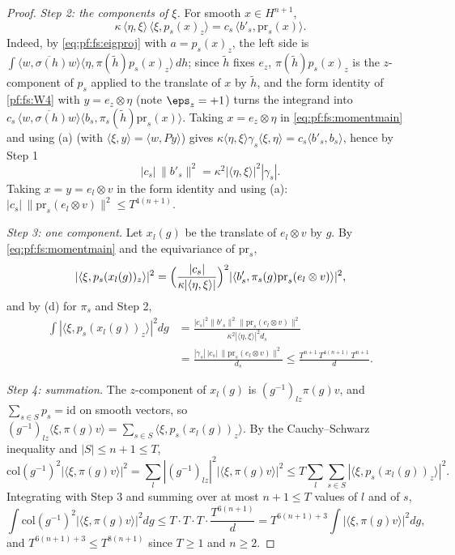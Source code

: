 \begin{proof}
\emph{Step 2: the components of $\xi$.} For smooth $x\in H^{n+1}$,
\begin{equation}\label{eq:pf:fs:momentmain}
\kappa\,\langle\eta,\xi\rangle\,\langle\xi,p_s(x)_z\rangle=c_s\,\langle b'_s,\mathrm{pr}_s(x)\rangle .
\end{equation}
Indeed, by \eqref{eq:pf:fs:eigproj} with $a=p_s(x)_z$, the left side is $\int\overline{\langle w,\sigma(h)w\rangle}\langle\eta,\pi(\tilde h)p_s(x)_z\rangle\,dh$; since
$\tilde h$ fixes $e_z$, $\pi(\tilde h)p_s(x)_z$ is the $z$-component of $p_s$ applied to the translate of $x$ by $\tilde h$, and the form identity of
\ref{pf:fs:W4} with $y=e_z\otimes\eta$ (note $\eps_z=+1$) turns the integrand into $c_s\,\overline{\langle w,\sigma(h)w\rangle}\langle b_s,\pi_s(\tilde h)\mathrm{pr}_s(x)\rangle$.
Taking $x=e_z\otimes\eta$ in \eqref{eq:pf:fs:momentmain} and using (a) (with $\langle\xi,y\rangle=\langle w,Py\rangle$) gives
$\kappa\langle\eta,\xi\rangle\gamma_s\langle\xi,\eta\rangle=c_s\langle b'_s,b_s\rangle$, hence by Step 1
\[
|c_s|\,\|b'_s\|^2=\kappa^2|\langle\eta,\xi\rangle|^2|\gamma_s| .
\]
Taking $x=y=e_l\otimes v$ in the form identity and using (a): $|c_s|\,\|\mathrm{pr}_s(e_l\otimes v)\|^2\le T^{4(n+1)}$.

\emph{Step 3: one component.} Let $x_l(g)$ be the translate of $e_l\otimes v$ by $g$. By \eqref{eq:pf:fs:momentmain} and the equivariance of
$\mathrm{pr}_s$,
\[
|\langle\xi,p_s(x_l(g))_z\rangle|^2=\Bigl(\frac{|c_s|}{\kappa|\langle\eta,\xi\rangle|}\Bigr)^2|\langle b'_s,\pi_s(g)\mathrm{pr}_s(e_l\otimes v)\rangle|^2,
\]
and by (d) for $\pi_s$ and Step 2,
\begin{align*}
\int|\langle\xi,p_s(x_l(g))_z\rangle|^2dg&=\frac{|c_s|^2\|b'_s\|^2\|\mathrm{pr}_s(e_l\otimes v)\|^2}{\kappa^2|\langle\eta,\xi\rangle|^2d_s}\\
&=\frac{|\gamma_s|\,|c_s|\,\|\mathrm{pr}_s(e_l\otimes v)\|^2}{d_s}\le\frac{T^{n+1}\,T^{4(n+1)}\,T^{n+1}}{d}.
\end{align*}

\emph{Step 4: summation.} The $z$-component of $x_l(g)$ is $(g^{-1})_{lz}\pi(g)v$, and $\sum_{s\in S}p_s=\mathrm{id}$ on smooth vectors, so
$(g^{-1})_{lz}\langle\xi,\pi(g)v\rangle=\sum_{s\in S}\langle\xi,p_s(x_l(g))_z\rangle$. By the Cauchy--Schwarz inequality and $|S|\le n+1\le T$,
\[
\mathrm{col}(g^{-1})^2|\langle\xi,\pi(g)v\rangle|^2=\sum_l|(g^{-1})_{lz}|^2|\langle\xi,\pi(g)v\rangle|^2\le T\sum_l\sum_{s\in S}|\langle\xi,p_s(x_l(g))_z\rangle|^2 .
\]
Integrating with Step 3 and summing over at most $n+1\le T$ values of $l$ and of $s$,
\[
\int\mathrm{col}(g^{-1})^2|\langle\xi,\pi(g)v\rangle|^2dg\le T\cdot T\cdot T\cdot\frac{T^{6(n+1)}}{d}=T^{6(n+1)+3}\int|\langle\xi,\pi(g)v\rangle|^2dg,
\]
and $T^{6(n+1)+3}\le T^{8(n+1)}$ since $T\ge1$ and $n\ge2$.
\end{proof}

